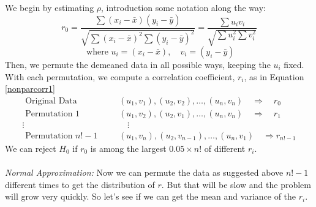 \documentclass[a4paper,12pt]{scrartcl}
\begin{document}
We begin by estimating $\rho$, introduction some notation along the
way:
\begin{equation}
   \label{nonparcorr1}
   r_0 = \frac{\sum (x_i - \bar{x})(y_i - \bar{y})}{\sqrt{\sum
   (x_i - \bar{x})^2 \sum (y_i - \bar{y})^2}} =
   \frac{\sum u_i v_i}{\sqrt{\sum
   u_i^2 \sum v_i^2}}
\end{equation}
\[ \text{ where } u_i = (x_i - \bar{x}), \quad v_i = (y_i - \bar{y}) \]
Then, we permute the demeaned data in all possible ways, keeping the
$u_i$ fixed. With each permutation, we compute a correlation
coefficient, $r_i$, as in Equation \ref{nonparcorr1}
\begin{align*}
   \text{ Original Data }  & \quad (u_1, v_1), (u_2, v_2), \ldots,
      (u_n, v_n) \quad \Rightarrow \quad r_0 \\
   \text{ Permutation 1 }  & \quad (u_1, v_2), (u_2, v_1), \ldots,
      (u_n, v_n) \quad \Rightarrow \quad r_1\\
   \vdots \qquad & \qquad \vdots\\
   \text{ Permutation $n!-1$ }  & \quad (u_1, v_n), (u_2, v_{n-1}),
      \ldots, (u_n, v_1) \quad \Rightarrow r_{n!-1}
\end{align*}
We can reject $H_0$ if $r_0$ is among the largest $0.05 \times n!$
of different $r_i$.
\\
\\
{\sl Normal Approximation:} Now we can permute the data as suggested
above $n!-1$ different times to get the distribution of $r$.
But that will be slow and the problem will grow very quickly.
So let's see if we can get the mean and variance of the $r_i$.
\end{document}
